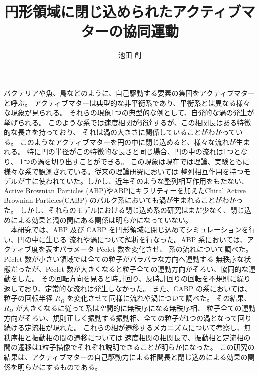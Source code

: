 \documentclass[a4paper]{jarticle}
\title{{\Large 円形領域に閉じ込められたアクティブマターの協同運動}}
\author{池田 創}
\date{}
\begin{document}
\maketitle
\thispagestyle{empty}
\normalsize
バクテリアや魚、鳥などのように、自己駆動する要素の集団をアクティブマターと呼ぶ。
アクティブマターは典型的な非平衡系であり、平衡系とは異なる様々な現象が見られる。
それらの現象1つの典型的な例として、自発的な渦の発生が挙げられる。
このような系では速度相関が発達するが、この相関長はある特徴的な長さを持っており、
それは渦の大きさに関係していることがわかっている。
このようなアクティブマターを円の中に閉じ込めると、様々な流れが生まれる。
特に円の半径がこの特徴的な長さと同じ場合、円の中の流れは1つとなり、
1つの渦を切り出すことができる。
この現象は現在では理論、実験ともに様々な系で観測されている。従来の理論研究においては
整列相互作用を持つモデルが主に使われていた。しかし、近年そのような整列相互作用をもたない、
Active Brownian Particles (ABP)やABPにキラリティーを加えたChiral Active Brownian Particles(CABP)
のバルク系においても渦が生まれることがわかった\cite{szamelLongrangedVelocityCorrelations2021,szamelLongrangedVelocityCorrelations2021,kurodaAnomalousFluctuationsHomogeneous2023,kurodaLongrangeTranslationalOrder2024}。
しかし、それらのモデルにおける閉じ込め系の研究はまだ少なく、閉じ込めによる効果と渦の間にある関係は明らかになっていない。\\
　本研究では、ABP 及び CABP を円形領域に閉じ込めてシミュレーションを行い、円の中に生じる
流れや渦について解析を行なった。ABP 系においては、アクティブ度を表すパラメータ Péclet 数を変化させ、
系の流れについて調べた。Péclet 数が小さい領域では全ての粒子がバラバラな方向へ運動する
無秩序な状態だったが、Péclet 数が大きくなると粒子全ての運動方向がそろい、協同的な運動をした。
その回転方向を見ると時計回り、反時計回りの回転を不規則に繰り返しており、定常的な流れは発生しなかった。
また、CABP の系においては、粒子の回転半径 $R_\Omega$ を変化させて同様に流れや渦について調べた。
その結果、$R_\Omega$ が大きくなるに従って系は空間的に無秩序になる無秩序相、
粒子全ての運動方向がそろい、規則正しく振動する振動相、全ての粒子が1つの渦となって回り続ける定流相が現れた。
これらの相が遷移するメカニズムについて考察し、無秩序相と振動相の間の遷移については
速度相関の相関長で、振動相と定流相の間の遷移は1粒子描像でそれぞれ説明できることが明らかになった。
この研究の結果は、アクティブマターの自己駆動力による相関長と閉じ込めによる効果の関係を明らかにするものである。

\normalsize{
\printbibliography[title=参考文献]
}
\end{document}
